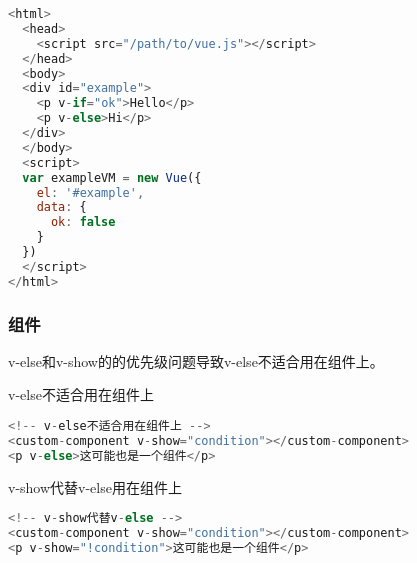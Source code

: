 \begin{lstlisting}[language=JavaScript]
<html>
  <head>
    <script src="/path/to/vue.js"></script>
  </head>
  <body>
  <div id="example">
    <p v-if="ok">Hello</p>
    <p v-else>Hi</p>
  </div>
  </body>
  <script>
  var exampleVM = new Vue({
    el: '#example',
    data: {
      ok: false
    }
  })
  </script>
</html>
\end{lstlisting}


\subsubsection{组件}

v-else和v-show的的优先级问题导致v-else不适合用在组件上。

\begin{compactitem}
\item v-else不适合用在组件上

\begin{lstlisting}[language=JavaScript]
<!-- v-else不适合用在组件上 -->
<custom-component v-show="condition"></custom-component>
<p v-else>这可能也是一个组件</p>
\end{lstlisting}

\item v-show代替v-else用在组件上

\begin{lstlisting}[language=JavaScript]
<!-- v-show代替v-else -->
<custom-component v-show="condition"></custom-component>
<p v-show="!condition">这可能也是一个组件</p>
\end{lstlisting}

\end{compactitem}





\begin{lstlisting}[language=JavaScript]

\end{lstlisting}




\begin{lstlisting}[language=JavaScript]

\end{lstlisting}




\begin{lstlisting}[language=JavaScript]

\end{lstlisting}




